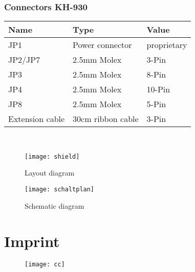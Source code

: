 \documentclass[fleqn,10pt]{SelfArx} %
\begin{document}
\subsubsection*{Connectors KH-930}

\begin{tabular}{lll}
\hline
\textbf{Name}      & \textbf{Type}        & \textbf{Value}  \\ \hline
JP1                & Power connector     & proprietary    \\ \hline
JP2/JP7            & 2.5mm Molex         & 3-Pin        \\ \hline
JP3                & 2.5mm Molex         & 8-Pin        \\ \hline
JP4                & 2.5mm Molex         & 10-Pin       \\ \hline
JP8                & 2.5mm Molex         & 5-Pin        \\ \hline
Extension cable    & 30cm ribbon cable   & 3-Pin        \\ \hline
\end{tabular}\\

 \begin{figure}[tbhp]\centering
 \texttt{[image: shield]}
 \caption{Layout diagram}
 \end{figure}

 \FloatBarrier

 \begin{figure*}[tbhp]\centering %
 \texttt{[image: schaltplan]}
 \caption{Schematic diagram}
 \end{figure*}

\FloatBarrier

\section*{Imprint} %


\begin{figure}[tbhp]
\texttt{[image: cc]}
\end{figure}
\end{document}
